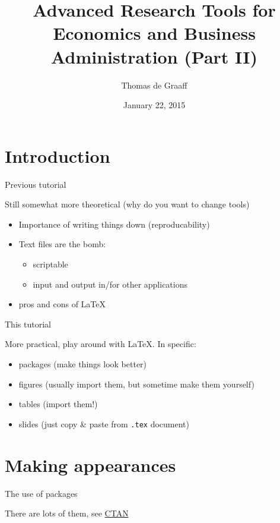 \documentclass[ignorenonframetext,]{beamer}
\title{Advanced Research Tools for Economics and Business Administration (Part
II)}
\author{Thomas de Graaff}
\date{January 22, 2015}
\begin{document}
\frame{\titlepage}

\section{Introduction}\label{introduction}

\begin{frame}{Previous tutorial}

Still somewhat more theoretical (why do you want to change tools)

\begin{itemize}
\item
  Importance of writing things down (reproducability)
\item
  Text files are the bomb:

  \begin{itemize}
  \itemsep1pt\parskip0pt
  \item
    scriptable
  \item
    input and output in/for other applications
  \end{itemize}
\item
  pros and cons of \LaTeX
\end{itemize}

\end{frame}

\begin{frame}{This tutorial}

More practical, play around with \LaTeX. In specific:

\begin{itemize}
\itemsep1pt\parskip0pt
\item
  packages (make things look better)
\item
  figures (usually import them, but sometime make them yourself)
\item
  tables (import them!)
\item
  slides (just copy \& paste from \texttt{.tex} document)
\end{itemize}

\end{frame}

\section{Making appearances}\label{making-appearances}

\begin{frame}{The use of packages}

There are lots of them, see \href{http://www.ctan.org}{CTAN}

\end{frame}
\end{document}
